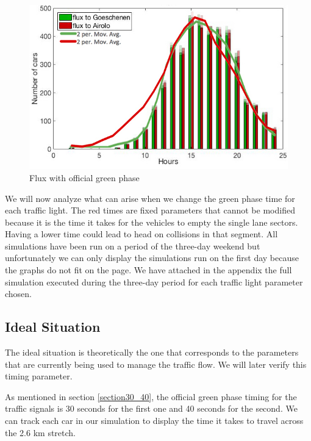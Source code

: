 \documentclass[11pt,a4paper,parskip=half-]{article}
\begin{document}
\begin{figure}[h!]
\includegraphics[scale=0.65]{ideal_timing}
\centering
\vspace*{-6mm}
\caption{Flux with official green phase}
\label{fig:flux30_40}
\end{figure}



We will now analyze what can arise when we change the green phase time for each traffic light. The red times are fixed parameters that cannot be modified because it is the time it takes for the vehicles to empty the single lane sectors. Having a lower time could lead to head on collisions in that segment. All simulations have been run on a period of the three-day weekend but unfortunately we can only display the simulations run on the first day because the graphs do not fit on the page. We have attached in the appendix the full simulation executed during the three-day period for each traffic light parameter chosen.



\subsection{Ideal Situation}
The ideal situation is theoretically the one that corresponds to the parameters that are currently being used to manage the traffic flow. We will later verify this timing parameter. 


 As mentioned in section \ref{section30_40}, the official green phase timing for the traffic signals is 30 seconds for the first one and 40 seconds for the second. We can track each car in our simulation to display the time it takes to travel across the 2.6 km stretch. 
 
\end{document}
